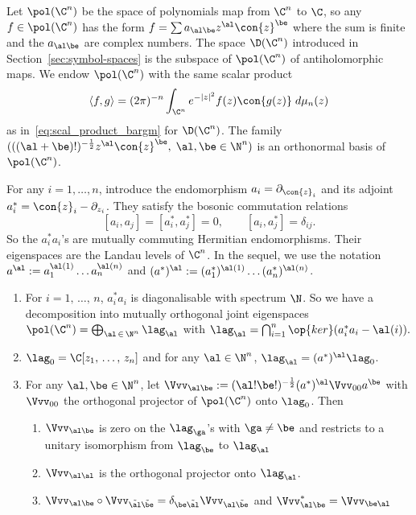 Let $\pol (\C^n)$ be the space of polynomials map from $\C^n$ to $\C$, so any $f
\in \pol (\C^n)$ has the form $ f = \sum a_{\al \be} z^ \al \con{z}^\be$ where the sum is finite and the $a_{\al \be}$ are complex numbers. The space $\D (\C^n)$ introduced in Section~\ref{sec:symbol-spaces} is the subspace of $\pol (\C^n)$ of antiholomorphic maps. We endow $\pol (
\C^n)$ with the same scalar product
\begin{gather}\label{eq:scal_prod_2}
\langle f, g \rangle = (2\pi)^{-n} \int_{\C^n} e^{-|z|^2} f (z) \con{g (z)} \; d \mu_n (z)
\end{gather}
as in~\eqref{eq:scal_product_bargm} for $\D (
\C^n)$. The family $(((\al + \be)!)^{-\frac{1}{2}} z^{\al} \con{z}^\be, \;
\al, \be \in \N^n)$ is an orthonormal basis of $\pol (\C^n)$.

For any $i =1, \ldots, n $, introduce the endomorphism $a_i = \partial_{\con{z}_i}$ and its adjoint $a_i^{*} = \con{z}_i - \partial_{z_i}$. They satisfy the bosonic commutation relations
\[
\left[a_i,a_j\right] = \left[a_i^{*}, a_j^{*}\right] = 0, \qquad \left[a_i, a_j^{*}\right] =
\delta_{ij}.
\]
So the $a_i^{*} a_i$'s are mutually commuting Hermitian endomorphisms. Their eigenspaces are the Landau levels of $\C^n$. In the sequel, we use the notation $a^\al := a_1^{\al(1)} \ldots a_n^{\al (n)}$ and $(a^{*})^{\al} := (a_1^*)^{\al(1)} \ldots (a_n^*)^{\al (n)}$.

\begin{prop}\label{prop:linearlandau}\leavevmode
\begin{enumerate}
\item\label{prop4.1.1} For $i=1,\, \ldots,\, n$, $a_i^* a_i$ is diagonalisable with spectrum $\N$. So we have a decomposition into mutually orthogonal joint eigenspaces $ \pol (\C^n) = \bigoplus_{\al\,\in\,\N^n} \lag_\al$ with $\lag_{\al} = \bigcap_{i=1}^{n} \op{ker} (a_i^* a_i - \al (i)).$
\item\label{prop4.1.2} $\lag_0 = \C [z_1,\,\ldots,\,z_n]$ and for any $\al \in \N^n$, $
\lag_{\al} = (a^*)^\al \lag_0 $.
\item\label{prop4.1.3} For any $\al, \be \in \N^n$, let $\Vvv_{\al \be} := (\al ! \be !)^{-\frac{1}{2}} (a^{*})^{\al} \Vvv_{00} a ^{\be}$ with $\Vvv_{00} $ the orthogonal projector of $\pol (\C^n)$ onto $\lag_0$. Then
\begin{enumerate}
\item\label{prop4.1.3.a} $\Vvv_{\al\be}$ is zero on the $\lag_{\ga}$'s with $\ga \neq
\be$ and restricts to a unitary isomorphism from $\lag_{\be}$ to $\lag_{\al}$
\item\label{prop4.1.3.b} $\Vvv_{\al \al}$ is the orthogonal projector onto $\lag_\al$.
\item\label{prop4.1.3.c} $ \Vvv_{\al \be} \circ \Vvv_{\tilde{\al} \tilde{\be}} =
\delta_{\be \tilde{\al}} \Vvv_{\al \tilde \be} $ and $\Vvv_{\al \be} ^{*} = \Vvv_{\be \al} $
\end{enumerate}
\end{enumerate}
\end{prop}



